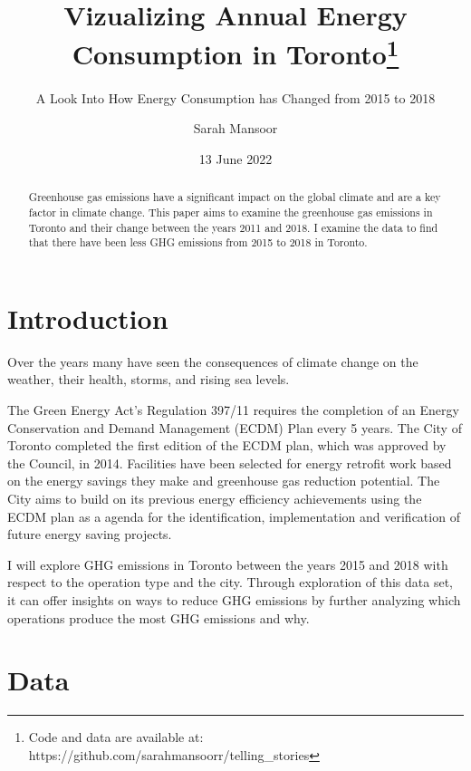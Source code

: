 \documentclass[
  letterpaper,
  DIV=11,
  numbers=noendperiod]{scrartcl}
\title{Vizualizing Annual Energy Consumption in Toronto\thanks{Code and
data are available at:
https://github.com/sarahmansoorr/telling\_stories}}
\subtitle{A Look Into How Energy Consumption has Changed from 2015 to
2018}
\author{Sarah Mansoor}
\date{13 June 2022}
\begin{document}
\maketitle
\begin{abstract}
Greenhouse gas emissions have a significant impact on the global climate
and are a key factor in climate change. This paper aims to examine the
greenhouse gas emissions in Toronto and their change between the years
2011 and 2018. I examine the data to find that there have been less GHG
emissions from 2015 to 2018 in Toronto.
\end{abstract}
\ifdefined\Shaded\renewenvironment{Shaded}{\begin{tcolorbox}[boxrule=0pt, borderline west={3pt}{0pt}{shadecolor}, enhanced, breakable, sharp corners, interior hidden, frame hidden]}{\end{tcolorbox}}\fi

\hypertarget{introduction}{%
\section{Introduction}\label{introduction}}

Over the years many have seen the consequences of climate change on the
weather, their health, storms, and rising sea levels.

The Green Energy Act's Regulation 397/11 requires the completion of an
Energy Conservation and Demand Management (ECDM) Plan every 5 years. The
City of Toronto completed the first edition of the ECDM plan, which was
approved by the Council, in 2014. Facilities have been selected for
energy retrofit work based on the energy savings they make and
greenhouse gas reduction potential. The City aims to build on its
previous energy efficiency achievements using the ECDM plan as a agenda
for the identification, implementation and verification of future energy
saving projects.

I will explore GHG emissions in Toronto between the years 2015 and 2018
with respect to the operation type and the city. Through exploration of
this data set, it can offer insights on ways to reduce GHG emissions by
further analyzing which operations produce the most GHG emissions and
why.

\pagebreak

\hypertarget{data}{%
\section{Data}\label{data}}
\end{document}
